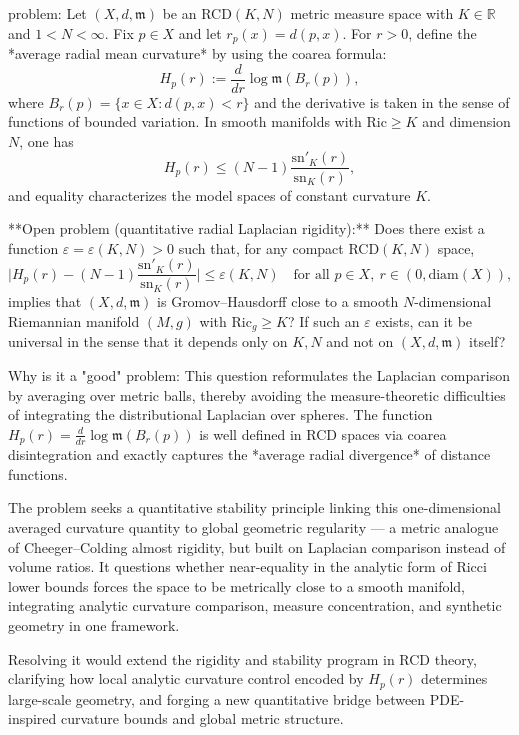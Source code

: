 problem:  
Let \((X,d,\mathfrak{m})\) be an RCD\((K,N)\) metric measure space with \(K\in\mathbb{R}\) and \(1<N<\infty\).  
Fix \(p\in X\) and let \(r_p(x)=d(p,x)\).  
For \(r>0\), define the *average radial mean curvature* by using the coarea formula:
\[
H_p(r):=\frac{d}{dr}\log\mathfrak{m}(B_r(p)),
\]
where \(B_r(p)=\{x\in X:d(p,x)<r\}\) and the derivative is taken in the sense of functions of bounded variation.  
In smooth manifolds with \(\mathrm{Ric}\ge K\) and dimension \(N\), one has
\[
H_p(r)\le (N-1)\frac{\mathrm{sn}'_K(r)}{\mathrm{sn}_K(r)},
\]
and equality characterizes the model spaces of constant curvature \(K\).

**Open problem (quantitative radial Laplacian rigidity):**  
Does there exist a function \(\varepsilon=\varepsilon(K,N)>0\) such that, for any compact RCD\((K,N)\) space,
\[
\Big|H_p(r)-(N-1)\frac{\mathrm{sn}'_K(r)}{\mathrm{sn}_K(r)}\Big|\le \varepsilon(K,N)
\quad\text{for all }p\in X,\ r\in(0,\mathrm{diam}(X)),
\]
implies that \((X,d,\mathfrak{m})\) is Gromov–Hausdorff close to a smooth \(N\)-dimensional Riemannian manifold \((M,g)\) with \(\mathrm{Ric}_g\ge K\)?  
If such an \(\varepsilon\) exists, can it be universal in the sense that it depends only on \(K,N\) and not on \((X,d,\mathfrak{m})\) itself?

Why is it a "good" problem:  
This question reformulates the Laplacian comparison by averaging over metric balls, thereby avoiding the measure-theoretic difficulties of integrating the distributional Laplacian over spheres. The function \(H_p(r)=\frac{d}{dr}\log\mathfrak{m}(B_r(p))\) is well defined in RCD spaces via coarea disintegration and exactly captures the *average radial divergence* of distance functions.  

The problem seeks a quantitative stability principle linking this one-dimensional averaged curvature quantity to global geometric regularity — a metric analogue of Cheeger–Colding almost rigidity, but built on Laplacian comparison instead of volume ratios. It questions whether near-equality in the analytic form of Ricci lower bounds forces the space to be metrically close to a smooth manifold, integrating analytic curvature comparison, measure concentration, and synthetic geometry in one framework.  

Resolving it would extend the rigidity and stability program in RCD theory, clarifying how local analytic curvature control encoded by \(H_p(r)\) determines large-scale geometry, and forging a new quantitative bridge between PDE-inspired curvature bounds and global metric structure.
